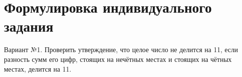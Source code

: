 \section{Формулировка индивидуального задания}

Вариант №1. Проверить утверждение, что целое число не делится на 11,
если разность сумм его цифр, стоящих на нечётных местах и стоящих на чётных местах,
делится на 11.
